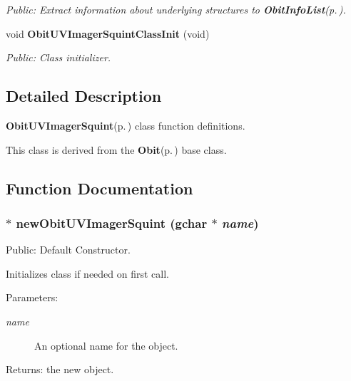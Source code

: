 \begin{CompactItemize}
\begin{CompactList}\small\item\em Public: Extract information about underlying structures to {\bf Obit\-Info\-List}{\rm (p.\,\pageref{structObitInfoList})}. \item\end{CompactList}\item 
void {\bf Obit\-UVImager\-Squint\-Class\-Init} (void)
\begin{CompactList}\small\item\em Public: Class initializer. \item\end{CompactList}\end{CompactItemize}


\subsection{Detailed Description}
{\bf Obit\-UVImager\-Squint}{\rm (p.\,\pageref{structObitUVImagerSquint})} class function definitions. 

This class is derived from the {\bf Obit}{\rm (p.\,\pageref{structObit})} base class.

\subsection{Function Documentation}
\subsubsection{$\ast$ new\-Obit\-UVImager\-Squint (gchar $\ast$ {\em name})}\label{ObitUVImagerSquint_8c_a6}


Public: Default Constructor. 

Initializes class if needed on first call. \begin{Desc}
\item[Parameters:]
\begin{description}
\item[{\em name}]An optional name for the object. \end{description}
\end{Desc}
\begin{Desc}
\item[Returns:]the new object. \end{Desc}
